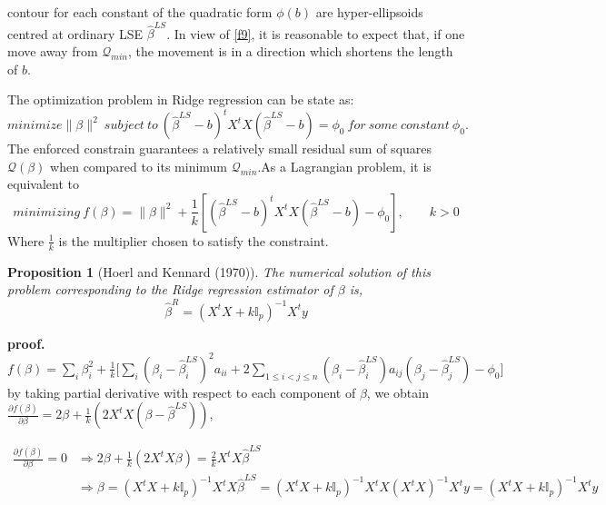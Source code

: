 \documentclass[12pt]{report}
\newtheorem {proposition}{Proposition}[section]  %
\begin{document}
	
	contour for each constant of the quadratic form $\phi(b)$ are hyper-ellipsoids centred at ordinary LSE $\hat{\beta}^{LS}$. In view of \eqref{f9}, it is reasonable to expect that, if one move away from $\mathcal{Q}_{min}$, the movement is in a direction which shortens the length of $b$.
	
	The optimization problem in Ridge regression can be state as:
	$$ minimize \parallel \beta \parallel^{2}\ subject\ to\ ( \hat{\beta}^{LS}-b)^{t}X^{t}X( \hat{\beta}^{LS}-b)=\phi_{0}\ for\ some\ constant\ \phi_{0}.$$
	The enforced constrain guarantees a relatively small residual sum of squares $\mathcal{Q}(\beta)$ when compared to its minimum $\mathcal{Q}_{min}$.As a Lagrangian problem, it is equivalent to 
	$$ minimizing\ f(\beta) = \parallel \beta \parallel^{2} + \frac{1}{k}[( \hat{\beta}^{LS}-b)^{t}X^{t}X( \hat{\beta}^{LS}-b)-\phi_{0}],\qquad k>0$$
	Where $\frac{1}{k}$ is the multiplier chosen to satisfy the constraint.
	\begin{proposition}[Hoerl and Kennard (1970)]
		The numerical solution of this problem corresponding to the Ridge regression estimator of $\beta$ is,
		\begin{equation}
			\hat{\beta}^{R}=(X^{t}X+k\mathbb{I}_{p})^{-1}X^{t}y
			\label{f11}
		\end{equation}
	\end{proposition}
	\textbf{proof.}
	{\selectfont $ f(\beta)=\sum_{i}\beta_{i}^{2}+\frac{1}{k}\bigg[\sum_{i}(\beta_{i}-\hat{\beta}^{LS}_{i})^{2}a_{ii}+2\sum_{1\leq i < j \leq n}(\beta_{i}-\hat{\beta}^{LS}_{i})a_{ij}(\beta_{j}-\hat{\beta}^{LS}_{j})-\phi_{0}\bigg] $\\
		by taking partial derivative with respect to each component of $\beta$, we obtain $\frac{\partial f(\beta)}{\partial \beta}=2\beta + \frac{1}{k}(2X^{t}X(\beta-\hat{\beta}^{LS}))$,}
	
	\begin{align*}
		\frac{\partial f(\beta)}{\partial \beta}=0& \Rightarrow 2\beta + \frac{1}{k}(2X^{t}X\beta)=\frac{2}{k}X^{t}X\hat{\beta}^{LS} \\
		& \Rightarrow \beta=(X^{t}X+k\mathbb{I}_{p})^{-1}X^{t}X\hat{\beta}^{LS}=(X^{t}X+k\mathbb{I}_{p})^{-1}X^{t}X(X^{t}X)^{-1}X^{t}y=(X^{t}X+k\mathbb{I}_{p})^{-1}X^{t}y
	\end{align*}
	
\end{document}
